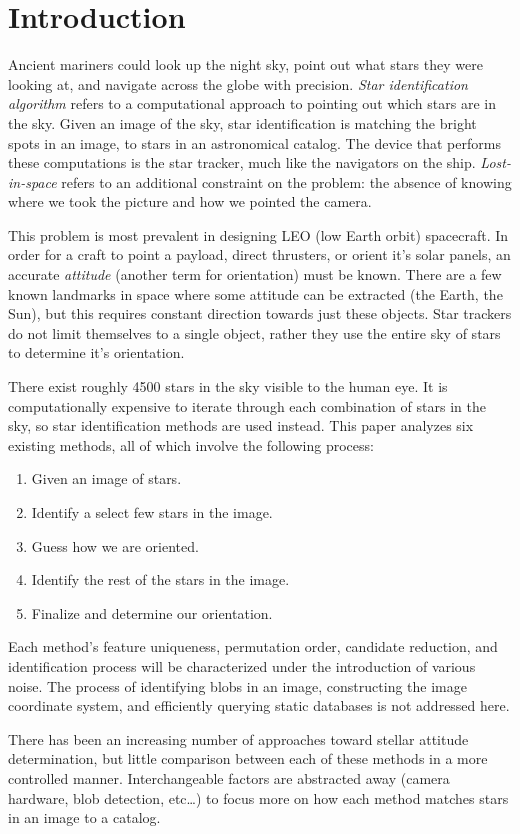 \section{Introduction}\label{sec:introduction}
Ancient mariners could look up the night sky, point out what stars they were looking at, and navigate across the globe
with precision.
\textit{Star identification algorithm} refers to a computational approach to pointing out which stars
are in the sky.
Given an image of the sky, star identification is matching the bright spots in an image, to stars in an astronomical
catalog.
The device that performs these computations is the star tracker, much like the navigators on the ship.
\textit{Lost-in-space} refers to an additional constraint on the problem: the absence of knowing where we took
the picture and how we pointed the camera.

This problem is most prevalent in designing LEO (low Earth orbit) spacecraft.
In order for a craft to point a payload, direct thrusters, or orient it's solar panels, an accurate
\textit{attitude} (another term for orientation) must be known.
There are a few known landmarks in space where some attitude can be extracted (the Earth, the Sun), but this
requires constant direction towards just these objects.
Star trackers do not limit themselves to a single object, rather they use the entire sky of stars to determine it's
orientation.

There exist roughly 4500 stars in the sky visible to the human eye.
It is computationally expensive to iterate through each combination of stars in the sky, so star identification methods
are used instead.
This paper analyzes six existing methods, all of which involve the following process:
\begin{enumerate}
    \item Given an image of stars.
    \item Identify a select few stars in the image.
    \item Guess how we are oriented.
    \item Identify the rest of the stars in the image.
    \item Finalize and determine our orientation.
\end{enumerate}

Each method's feature uniqueness, permutation order, candidate reduction, and identification process will be
characterized under the introduction of various noise.
The process of identifying blobs in an image, constructing the image coordinate system, and efficiently querying
static databases is not addressed here.

There has been an increasing number of approaches toward stellar attitude determination, but little comparison between
each of these methods in a more controlled manner.
Interchangeable factors are abstracted away (camera hardware, blob detection, etc\ldots) to focus more on how each
method matches stars in an image to a catalog.
